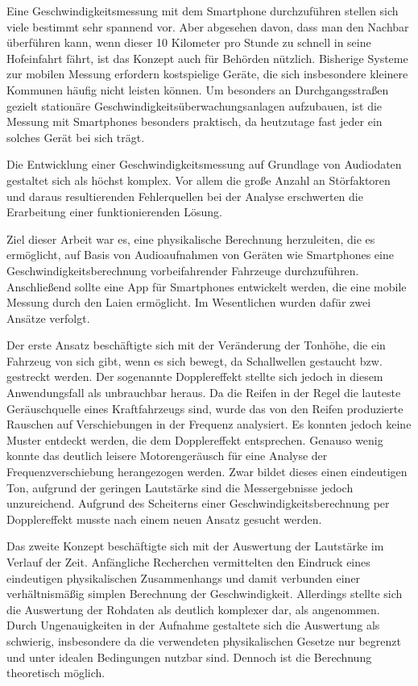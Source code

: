 Eine Geschwindigkeitsmessung mit dem Smartphone durchzuführen stellen sich viele bestimmt sehr spannend vor. Aber abgesehen davon, dass man den Nachbar überführen kann, wenn dieser 10 Kilometer pro Stunde zu schnell in seine Hofeinfahrt fährt, ist das Konzept auch für Behörden nützlich. Bisherige Systeme zur mobilen Messung erfordern kostspielige Geräte, die sich insbesondere kleinere Kommunen häufig nicht leisten können. Um besonders an Durchgangsstraßen gezielt stationäre Geschwindigkeitsüberwachungsanlagen aufzubauen, ist die Messung mit Smartphones besonders praktisch, da heutzutage fast jeder ein solches Gerät bei sich trägt.

\vspace{5mm}

\noindent
Die Entwicklung einer Geschwindigkeitsmessung auf Grundlage von Audiodaten gestaltet sich als höchst komplex. Vor allem die große Anzahl an Störfaktoren und daraus resultierenden Fehlerquellen bei der Analyse erschwerten die Erarbeitung einer funktionierenden Lösung.

Ziel dieser Arbeit war es, eine physikalische Berechnung herzuleiten, die es ermöglicht, auf Basis von Audioaufnahmen von Geräten wie Smartphones eine Geschwindigkeitsberechnung vorbeifahrender Fahrzeuge durchzuführen. Anschließend sollte eine App für Smartphones entwickelt werden, die eine mobile Messung durch den Laien ermöglicht. Im Wesentlichen wurden dafür zwei Ansätze verfolgt.

Der erste Ansatz beschäftigte sich mit der Veränderung der Tonhöhe, die ein Fahrzeug von sich gibt, wenn es sich bewegt, da Schallwellen gestaucht bzw. gestreckt werden. Der sogenannte Dopplereffekt stellte sich jedoch in diesem Anwendungsfall als unbrauchbar heraus. Da die Reifen in der Regel die lauteste Geräuschquelle eines Kraftfahrzeugs sind, wurde das von den Reifen produzierte Rauschen auf Verschiebungen in der Frequenz analysiert. Es konnten jedoch keine Muster entdeckt werden, die dem Dopplereffekt entsprechen. Genauso wenig konnte das deutlich leisere Motorengeräusch für eine Analyse der Frequenzverschiebung herangezogen werden. Zwar bildet dieses einen eindeutigen Ton, aufgrund der geringen Lautstärke sind die Messergebnisse jedoch unzureichend. Aufgrund des Scheiterns einer Geschwindigkeitsberechnung per Dopplereffekt musste nach einem neuen Ansatz gesucht werden.

Das zweite Konzept beschäftigte sich mit der Auswertung der Lautstärke im Verlauf der Zeit. Anfängliche Recherchen vermittelten den Eindruck eines eindeutigen physikalischen Zusammenhangs und damit verbunden einer verhältnismäßig simplen Berechnung der Geschwindigkeit. Allerdings stellte sich die Auswertung der Rohdaten als deutlich komplexer dar, als angenommen. Durch Ungenauigkeiten in der Aufnahme gestaltete sich die Auswertung als schwierig, insbesondere da die verwendeten physikalischen Gesetze nur begrenzt und unter idealen Bedingungen nutzbar sind. Dennoch ist die Berechnung theoretisch möglich.

